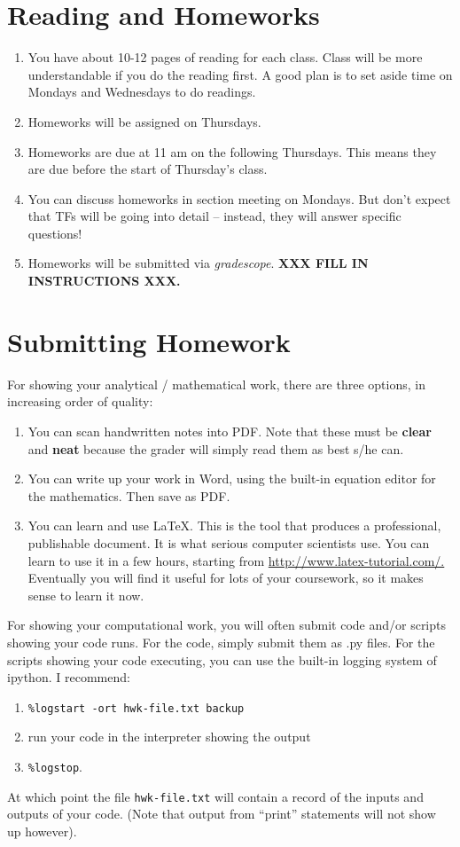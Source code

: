 \documentclass[11pt]{article}
\begin{document}
\section*{Reading and Homeworks}

\begin{enumerate}
\item  You have about 10-12 pages of reading for each class.   Class will be
more understandable if you do the reading first.   A good plan is to set aside
time on Mondays and Wednesdays to do readings.
\item  Homeworks will be assigned on Thursdays.
\item Homeworks are due at 11 am on the following Thursdays.  This means
  they are due 
before the start of Thursday's class.
\item You can discuss homeworks in section meeting on Mondays.   But don't
expect that TFs will be going into detail -- instead, they will
answer specific questions!
\item Homeworks will be submitted via \emph{gradescope}.  \textbf{XXX FILL IN
  INSTRUCTIONS XXX.}
\end{enumerate}

\section*{Submitting Homework}
For showing your analytical / mathematical work, there are three
options, in increasing order of quality:
\begin{enumerate}
\item You can scan handwritten notes into PDF.    Note that these must
  be \textbf{clear} and \textbf{neat} because the grader will simply
  read them as best s/he can.
\item You can write up your work in Word, using the built-in equation
  editor for the mathematics.   Then save as PDF.   
\item You can learn and use \LaTeX.   This is the tool that produces a
  professional, publishable document.   It is what serious
  computer scientists use.  You can learn to use it in a few hours,
  starting from \url{http://www.latex-tutorial.com/.}   Eventually you will
  find it useful for lots of your coursework, so it makes sense to learn it
  now. 
\end{enumerate}

For showing your computational work, you will often submit code 
and/or scripts showing your code runs.   For the code, simply
submit them as .py files.   For the scripts showing your code executing,
you can use the built-in logging system of ipython.   I recommend: 
\begin{enumerate}
\item \verb$%logstart -ort hwk-file.txt backup$
\item run your code in the interpreter showing the output
\item \verb$%logstop$.
\end{enumerate}
At which point the file \texttt{hwk-file.txt} will contain a record of
the inputs and outputs of your code.   (Note that output from ``print'' statements
will not show up however). 
\end{document}
